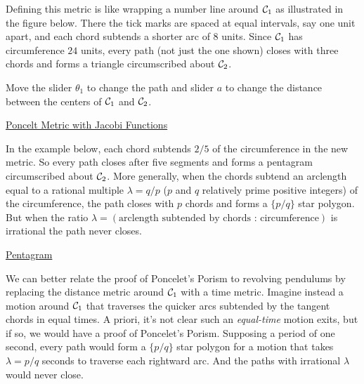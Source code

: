 \documentclass{ximera}
\begin{document}
Defining this metric is like wrapping a number line around ${\cal C}_1$ as illustrated in the figure below. There the tick marks are spaced at equal intervals, say one unit apart, and each chord subtends a shorter arc of $8$ units. Since ${\cal C}_1$ has circumference $24$ units, every path (not just the one shown) closes with three chords and forms a triangle circumscribed about ${\cal C}_2$.  

\begin{exploration}
Move the slider $\theta_1$ to change the path and slider $a$ to change the distance between the centers of ${\cal C}_1$ and ${\cal C}_2$.
 
\begin{onlineOnly}
    \begin{center}
\end{center}
\end{onlineOnly}

\href{https://www.desmos.com/calculator/wzctareiln}{Poncelt Metric with Jacobi Functions}

\end{exploration}

In the example below, each chord subtends $2/5$ of the circumference in the new metric. So every path closes after five segments and forms a pentagram circumscribed about ${\cal C}_2$. More generally, when the chords subtend an arclength equal to a rational multiple $\lambda = q/p$ ($p$ and $q$ relatively prime positive integers) of the circumference, the path closes with $p$ chords and forms a $\{p/q \}$ star polygon. But when the ratio $\lambda = (\text{arclength subtended by chords : circumference})$ is irrational the path never closes.

\begin{exploration}
\begin{onlineOnly}
    \begin{center}
\end{center}
\end{onlineOnly}

\href{https://www.desmos.com/calculator/qco4rghhfi}{Pentagram}

\end{exploration}

We can better relate the proof of Poncelet's Porism to revolving pendulums by replacing the distance metric around ${\cal C}_1$ with a time metric. Imagine instead a motion around ${\cal C}_1$ that traverses the quicker arcs subtended by the tangent chords in equal times. A priori, it's not clear such an \emph{equal-time} motion exits, but if so, we would have a proof of Poncelet's Porism. Supposing a period of one second, every path would form a $\{p/q \}$ star polygon for a motion that takes $\lambda = p/q$ seconds to traverse each rightward arc. And the paths with irrational $\lambda$ would never close. 
\end{document}
